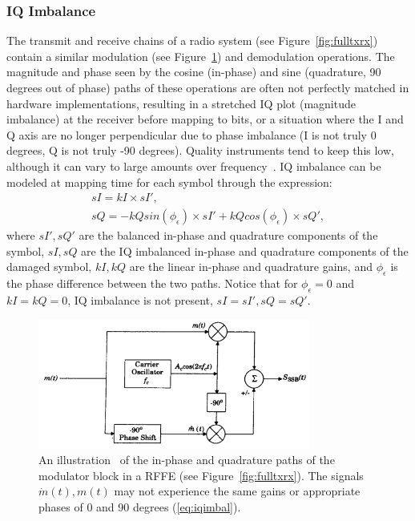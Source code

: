 \subsubsection{IQ Imbalance}
\label{iq}
The transmit and receive chains of a radio system (see Figure~\ref{fig:fulltxrx}) contain a similar modulation (see Figure~\ref{fig:sinecosine}) and demodulation operations. The magnitude and phase seen by the cosine (in-phase) and sine (quadrature, 90 degrees out of phase) paths of these operations are often not perfectly matched in hardware implementations, resulting in a stretched IQ plot (magnitude imbalance) at the receiver before mapping to bits, or a situation where the I and Q axis are no longer perpendicular due to phase imbalance (I is not truly 0 degrees, Q is not truly -90 degrees). Quality instruments tend to keep this low, although it can vary to large amounts over frequency~\cite{n210sbx}. IQ imbalance can be modeled at mapping time for each symbol through the expression:
\begin{subequations}
\label{eq:iqimbal}
\begin{align}
sI = kI \times sI',
\\
sQ = -kQsin(\phi_{\epsilon}) \times sI' + kQcos(\phi_{\epsilon}) \times sQ',
\end{align}
\end{subequations}
where $sI', sQ'$ are the balanced in-phase and quadrature components of the symbol, $sI, sQ$ are the IQ imbalanced in-phase and quadrature components of the damaged symbol, $kI, kQ$ are the linear in-phase and quadrature gains, and $\phi_{\epsilon}$ is the phase difference between the two paths. Notice that for $\phi_{\epsilon} = 0$ and $kI=kQ=0$, IQ imbalance is not present, $sI=sI',sQ=sQ'$.

\FloatBarrier
\begin{figure}[ht!]
	\centering	\includegraphics[width=0.8\textwidth,keepaspectratio]{figs/sinecosine.png}
    \caption{An illustration~\cite{rappaport1996wireless} of the in-phase and quadrature paths of the modulator block in a RFFE (see Figure~\ref{fig:fulltxrx}). The signals $\dot{m}(t), m(t)$ may not experience the same gains or appropriate phases of 0 and 90 degrees (\ref{eq:iqimbal}).} 
\label{fig:sinecosine}      
\end{figure}
\FloatBarrier

